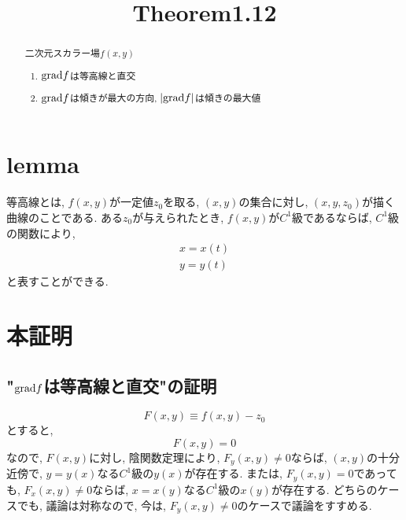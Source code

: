 \documentclass{jsarticle}
\title{Theorem1.12}
\newcommand*{\grad}{{\rm grad}}
\begin{document}
\maketitle

\begin{abstract}
  二次元スカラー場$f(x, y)$
  \begin{enumerate}
    \item $\grad f$は等高線と直交 \label{item-1}
    \item $\grad f$は傾きが最大の方向, $|\grad f |$は傾きの最大値
  \end{enumerate}
\end{abstract}

\section*{lemma}
等高線とは, $f(x, y)$が一定値$z_0$を取る, $(x, y)$の集合に対し, $(x, y, z_0)$が描く曲線のことである. 
ある$z_0$が与えられたとき, $f(x, y)$が$C^1$級であるならば, $C^1$級の関数により, 
\begin{subequations}
  \begin{eqnarray}
    x = x(t) \\
    y = y(t)
  \end{eqnarray}
\end{subequations}
と表すことができる. 

\section*{本証明}
\subsection*{"$\grad f$は等高線と直交"の証明}
\[
  F(x, y) \equiv f(x, y) - z_0
\]
とすると, 
\[
  F(x, y) = 0
\]
なので, $F(x, y)$に対し, 陰関数定理により, $F_y(x, y) \neq 0$ならば, $(x, y)$の十分近傍で, $y = y(x)$なる$C^1$級の$y(x)$が存在する. 
または, $F_y(x, y) = 0$であっても, $F_x(x, y) \neq 0$ならば, $x = x(y)$なる$C^1$級の$x(y)$が存在する. 
どちらのケースでも, 議論は対称なので, 今は, $F_y(x, y) \neq 0$のケースで議論をすすめる. 
\end{document}
